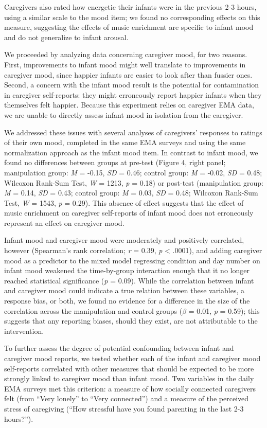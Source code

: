 \documentclass[
]{article}
\begin{document}
Caregivers also rated how energetic their infants were in the previous
2-3 hours, using a similar scale to the mood item; we found no
corresponding effects on this measure, suggesting the effects of music
enrichment are specific to infant mood and do not generalize to infant
arousal.

We proceeded by analyzing data concerning caregiver mood, for two
reasons. First, improvements to infant mood might well translate to
improvements in caregiver mood, since happier infants are easier to look
after than fussier ones. Second, a concern with the infant mood result
is the potential for contamination in caregiver self-reports: they might
erroneously report happier infants when they themselves felt happier.
Because this experiment relies on caregiver EMA data, we are unable to
directly assess infant mood in isolation from the caregiver.

We addressed these issues with several analyses of caregivers' responses
to ratings of their own mood, completed in the same EMA surveys and
using the same normalization approach as the infant mood item. In
contrast to infant mood, we found no differences between groups at
pre-test (Figure 4, right panel; manipulation group: \emph{M} = -0.15,
\emph{SD} = 0.46; control group: \emph{M} = -0.02, \emph{SD} = 0.48;
Wilcoxon Rank-Sum Test, \emph{W} = 1213, \emph{p} = 0.18) or post-test
(manipulation group: \emph{M} = 0.14, \emph{SD} = 0.43; control group:
\emph{M} = 0.03, \emph{SD} = 0.48; Wilcoxon Rank-Sum Test, \emph{W} =
1543, \emph{p} = 0.29). This absence of effect suggests that the effect
of music enrichment on caregiver self-reports of infant mood does not
erroneously represent an effect on caregiver mood.

Infant mood and caregiver mood were moderately and positively
correlated, however (Spearman's rank correlation; \emph{r} = 0.39,
\emph{p} \textless{} .0001), and adding caregiver mood as a predictor to
the mixed model regressing condition and day number on infant mood
weakened the time-by-group interaction enough that it no longer reached
statistical significance (\emph{p} = 0.09). While the correlation
between infant and caregiver mood could indicate a true relation between
these variables, a response bias, or both, we found no evidence for a
difference in the size of the correlation across the manipulation and
control groups (\(\beta\) = 0.01, \emph{p} = 0.59); this suggests that
any reporting biases, should they exist, are not attributable to the
intervention.

To further assess the degree of potential confounding between infant and
caregiver mood reports, we tested whether each of the infant and
caregiver mood self-reports correlated with other measures that should
be expected to be more strongly linked to caregiver mood than infant
mood. Two variables in the daily EMA surveys met this criterion: a
measure of how socially connected caregivers felt (from ``Very lonely''
to ``Very connected'') and a measure of the perceived stress of
caregiving (``How stressful have you found parenting in the last 2-3
hours?'').
\end{document}
